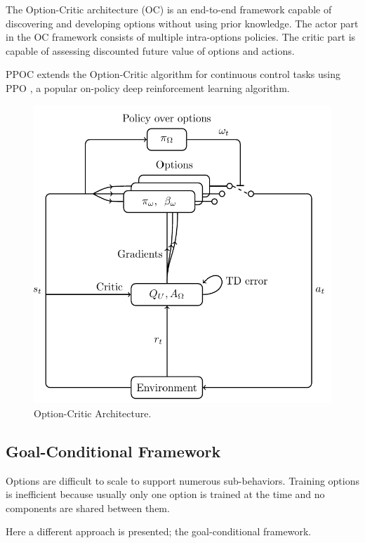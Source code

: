 The Option-Critic architecture (OC) \cite{option-critic} is an end-to-end framework capable of discovering and developing options without
using prior knowledge. The actor part in the OC framework consists of multiple intra-options policies. The critic part is capable of assessing discounted
future value of options and actions.

PPOC \cite{PPOC} extends the Option-Critic algorithm for continuous control tasks using PPO \cite{PPO}, a popular on-policy deep reinforcement learning algorithm.

\begin{figure}[H]
    \centering
    \label{fig:options_critic}
    \caption{Option-Critic Architecture.}
    \includegraphics[scale=0.2]{Images/option-critic.png}
\end{figure}

\subsection{Goal-Conditional Framework}

Options are difficult to scale to support numerous sub-behaviors. Training options is inefficient because usually only
one option is trained at the time and no components are shared between them.

Here a different approach is presented; the goal-conditional framework.

